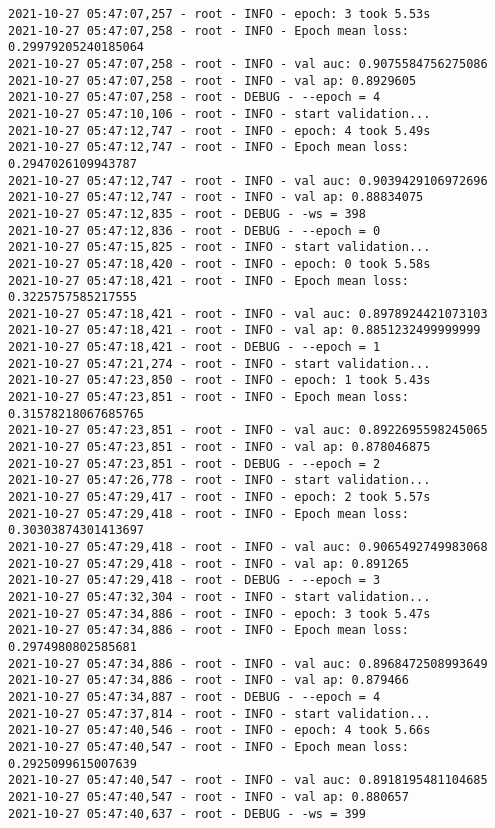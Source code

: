 \documentclass[11pt]{article}
\begin{document}
\begin{verbatim}
2021-10-27 05:47:07,257 - root - INFO - epoch: 3 took 5.53s
2021-10-27 05:47:07,258 - root - INFO - Epoch mean loss: 0.29979205240185064
2021-10-27 05:47:07,258 - root - INFO - val auc: 0.9075584756275086
2021-10-27 05:47:07,258 - root - INFO - val ap: 0.8929605
2021-10-27 05:47:07,258 - root - DEBUG - --epoch = 4
2021-10-27 05:47:10,106 - root - INFO - start validation...
2021-10-27 05:47:12,747 - root - INFO - epoch: 4 took 5.49s
2021-10-27 05:47:12,747 - root - INFO - Epoch mean loss: 0.2947026109943787
2021-10-27 05:47:12,747 - root - INFO - val auc: 0.9039429106972696
2021-10-27 05:47:12,747 - root - INFO - val ap: 0.88834075
2021-10-27 05:47:12,835 - root - DEBUG - -ws = 398
2021-10-27 05:47:12,836 - root - DEBUG - --epoch = 0
2021-10-27 05:47:15,825 - root - INFO - start validation...
2021-10-27 05:47:18,420 - root - INFO - epoch: 0 took 5.58s
2021-10-27 05:47:18,421 - root - INFO - Epoch mean loss: 0.3225757585217555
2021-10-27 05:47:18,421 - root - INFO - val auc: 0.8978924421073103
2021-10-27 05:47:18,421 - root - INFO - val ap: 0.8851232499999999
2021-10-27 05:47:18,421 - root - DEBUG - --epoch = 1
2021-10-27 05:47:21,274 - root - INFO - start validation...
2021-10-27 05:47:23,850 - root - INFO - epoch: 1 took 5.43s
2021-10-27 05:47:23,851 - root - INFO - Epoch mean loss: 0.31578218067685765
2021-10-27 05:47:23,851 - root - INFO - val auc: 0.8922695598245065
2021-10-27 05:47:23,851 - root - INFO - val ap: 0.878046875
2021-10-27 05:47:23,851 - root - DEBUG - --epoch = 2
2021-10-27 05:47:26,778 - root - INFO - start validation...
2021-10-27 05:47:29,417 - root - INFO - epoch: 2 took 5.57s
2021-10-27 05:47:29,418 - root - INFO - Epoch mean loss: 0.30303874301413697
2021-10-27 05:47:29,418 - root - INFO - val auc: 0.9065492749983068
2021-10-27 05:47:29,418 - root - INFO - val ap: 0.891265
2021-10-27 05:47:29,418 - root - DEBUG - --epoch = 3
2021-10-27 05:47:32,304 - root - INFO - start validation...
2021-10-27 05:47:34,886 - root - INFO - epoch: 3 took 5.47s
2021-10-27 05:47:34,886 - root - INFO - Epoch mean loss: 0.2974980802585681
2021-10-27 05:47:34,886 - root - INFO - val auc: 0.8968472508993649
2021-10-27 05:47:34,886 - root - INFO - val ap: 0.879466
2021-10-27 05:47:34,887 - root - DEBUG - --epoch = 4
2021-10-27 05:47:37,814 - root - INFO - start validation...
2021-10-27 05:47:40,546 - root - INFO - epoch: 4 took 5.66s
2021-10-27 05:47:40,547 - root - INFO - Epoch mean loss: 0.2925099615007639
2021-10-27 05:47:40,547 - root - INFO - val auc: 0.8918195481104685
2021-10-27 05:47:40,547 - root - INFO - val ap: 0.880657
2021-10-27 05:47:40,637 - root - DEBUG - -ws = 399

\end{verbatim}
\end{document}
